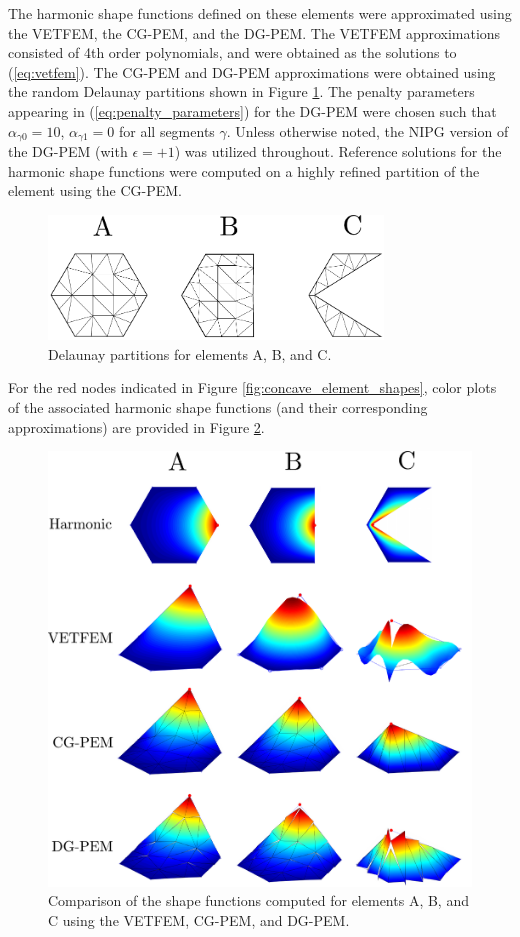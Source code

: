 The harmonic shape functions defined on these elements were approximated using the VETFEM, the CG-PEM, and the DG-PEM. The VETFEM approximations consisted of 4th order polynomials, and were obtained as the solutions to (\ref{eq:vetfem}). The CG-PEM and DG-PEM approximations were obtained using the random Delaunay partitions shown in Figure \ref{fig:concave_element_partitions}. The penalty parameters appearing in (\ref{eq:penalty_parameters}) for the DG-PEM were chosen such that $\alpha_{\gamma0} = 10$, $\alpha_{\gamma1} = 0$ for all segments $\gamma$. Unless otherwise noted, the NIPG version of the DG-PEM (with $\epsilon = +1$) was utilized throughout. Reference solutions for the harmonic shape functions were computed on a highly refined partition of the element using the CG-PEM.

\begin{figure}[!h]
  \centering
  \includegraphics[width=3.5in]{figures/concave_element_partitions.pdf}  \caption{Delaunay partitions for elements A, B, and C.}
  \label{fig:concave_element_partitions}
\end{figure}

For the red nodes indicated in Figure \ref{fig:concave_element_shapes}, color plots of the associated harmonic shape functions (and their corresponding approximations) are provided in Figure \ref{fig:concave_element_comparison}.

\begin{figure}[!h]
  \centering
  \includegraphics[width=5.0in]{figures/concave_element_comparison.pdf}  \caption{Comparison of the shape functions computed for elements A, B, and C using the VETFEM, CG-PEM, and DG-PEM.}
  \label{fig:concave_element_comparison}
\end{figure}

